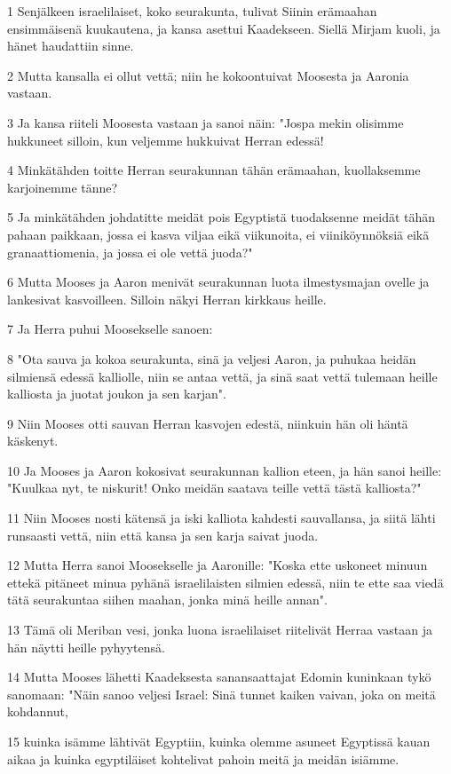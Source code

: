 \par 1 Senjälkeen israelilaiset, koko seurakunta, tulivat Siinin erämaahan ensimmäisenä kuukautena, ja kansa asettui Kaadekseen. Siellä Mirjam kuoli, ja hänet haudattiin sinne.
\par 2 Mutta kansalla ei ollut vettä; niin he kokoontuivat Moosesta ja Aaronia vastaan.
\par 3 Ja kansa riiteli Moosesta vastaan ja sanoi näin: "Jospa mekin olisimme hukkuneet silloin, kun veljemme hukkuivat Herran edessä!
\par 4 Minkätähden toitte Herran seurakunnan tähän erämaahan, kuollaksemme karjoinemme tänne?
\par 5 Ja minkätähden johdatitte meidät pois Egyptistä tuodaksenne meidät tähän pahaan paikkaan, jossa ei kasva viljaa eikä viikunoita, ei viiniköynnöksiä eikä granaattiomenia, ja jossa ei ole vettä juoda?"
\par 6 Mutta Mooses ja Aaron menivät seurakunnan luota ilmestysmajan ovelle ja lankesivat kasvoilleen. Silloin näkyi Herran kirkkaus heille.
\par 7 Ja Herra puhui Moosekselle sanoen:
\par 8 "Ota sauva ja kokoa seurakunta, sinä ja veljesi Aaron, ja puhukaa heidän silmiensä edessä kalliolle, niin se antaa vettä, ja sinä saat vettä tulemaan heille kalliosta ja juotat joukon ja sen karjan".
\par 9 Niin Mooses otti sauvan Herran kasvojen edestä, niinkuin hän oli häntä käskenyt.
\par 10 Ja Mooses ja Aaron kokosivat seurakunnan kallion eteen, ja hän sanoi heille: "Kuulkaa nyt, te niskurit! Onko meidän saatava teille vettä tästä kalliosta?"
\par 11 Niin Mooses nosti kätensä ja iski kalliota kahdesti sauvallansa, ja siitä lähti runsaasti vettä, niin että kansa ja sen karja saivat juoda.
\par 12 Mutta Herra sanoi Moosekselle ja Aaronille: "Koska ette uskoneet minuun ettekä pitäneet minua pyhänä israelilaisten silmien edessä, niin te ette saa viedä tätä seurakuntaa siihen maahan, jonka minä heille annan".
\par 13 Tämä oli Meriban vesi, jonka luona israelilaiset riitelivät Herraa vastaan ja hän näytti heille pyhyytensä.
\par 14 Mutta Mooses lähetti Kaadeksesta sanansaattajat Edomin kuninkaan tykö sanomaan: "Näin sanoo veljesi Israel: Sinä tunnet kaiken vaivan, joka on meitä kohdannut,
\par 15 kuinka isämme lähtivät Egyptiin, kuinka olemme asuneet Egyptissä kauan aikaa ja kuinka egyptiläiset kohtelivat pahoin meitä ja meidän isiämme.
